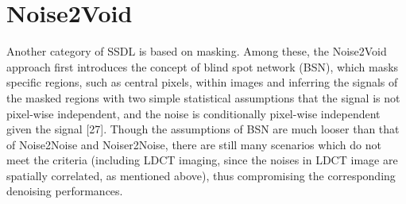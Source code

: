 \chapter{Noise2Void}

Another category of SSDL is based on masking. Among these, the Noise2Void approach first introduces the concept of blind spot network (BSN), which masks specific regions, such as central pixels, within images and inferring the signals of the masked regions with two simple statistical assumptions that the signal is not pixel-wise independent, and the noise is conditionally pixel-wise independent given the signal [27]. Though the assumptions of BSN are much looser than that of Noise2Noise and Noiser2Noise, there are still many scenarios which do not meet the criteria (including LDCT imaging, since the noises in LDCT image are spatially correlated, as mentioned above), thus compromising the corresponding denoising performances. %
